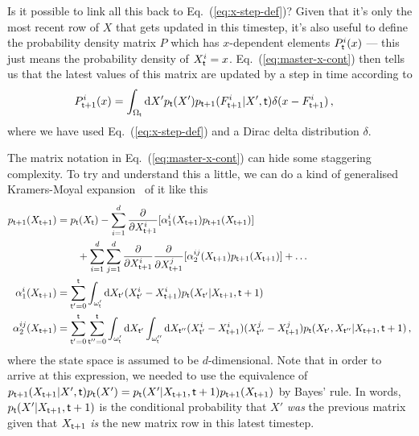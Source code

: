 \documentclass{book}
\begin{document}
Is it possible to link all this back to Eq.~(\ref{eq:x-step-def})? Given that it's only the most recent row of $X$ that gets updated in this timestep, it's also useful to define the probability density matrix $P$ which has $x$-dependent elements $P^i_{\sf t}(x)$ --- this just means the probability density of $X^i_{\sf t}=x$. Eq.~(\ref{eq:master-x-cont}) then tells us that the latest values of this matrix are updated by a step in time according to
\begin{align}
P^i_{{\sf t}+1}(x) &= \int_{\Omega_{\sf t}}{\rm d}X' p_{\sf t}(X') p_{{\sf t}+1}(F^i_{{\sf t}+1}|X',{\sf t}) \delta (x-F^i_{{\sf t}+1}) \label{eq:master-x-cont-update}\,,
\end{align}
where we have used Eq.~(\ref{eq:x-step-def}) and a Dirac delta distribution $\delta$.

The matrix notation in Eq.~(\ref{eq:master-x-cont}) can hide some staggering complexity. To try and understand this a little, we can do a kind of generalised Kramers-Moyal expansion~\cite{kramers1940brownian,moyal1949stochastic} of it like this
\begin{align}
p_{{\sf t}+1}(X_{{\sf t}+1}) &= p_{{\sf t}}(X_{{\sf t}}) - \sum_{i=1}^d\frac{\partial}{\partial X^i_{{\sf t}+1}}[\alpha^i_1 (X_{{\sf t}+1})p_{{\sf t}+1}(X_{{\sf t}+1})] \nonumber \\
& \qquad + \sum_{i=1}^d\sum_{j=1}^d\frac{\partial}{\partial X^i_{{\sf t}+1}}\frac{\partial}{\partial X^j_{{\sf t}+1}}[\alpha^{ij}_2 (X_{{\sf t}+1})p_{{\sf t}+1}(X_{{\sf t}+1})] + \dots \label{eq:master-x-cont-kramers-moyal} \\
\alpha^i_1(X_{{\sf t}+1}) &= \sum_{{\sf t}'=0}^{\sf t}\int_{\omega_{\sf t}'} {\rm d}X_{{\sf t}'}(X^i_{{\sf t}'}-X^i_{{\sf t}+1})p_{\sf t}(X_{{\sf t}'}\vert X_{{\sf t}+1},{\sf t}+1) \\
\alpha^{ij}_2(X_{{\sf t}+1}) &= \sum_{{\sf t}'=0}^{\sf t}\sum_{{\sf t}''=0}^{\sf t}\int_{\omega_{\sf t}'} {\rm d}X_{{\sf t}'}\int_{\omega_{\sf t}''} {\rm d}X_{{\sf t}''}(X^i_{{\sf t}'}-X^i_{{\sf t}+1})(X^j_{{\sf t}''}-X^j_{{\sf t}+1})p_{\sf t}(X_{{\sf t}'}, X_{{\sf t}''}\vert X_{{\sf t}+1},{\sf t}+1) \,,
\end{align}
where the state space is assumed to be $d$-dimensional. Note that in order to arrive at this expression, we needed to use the equivalence of $p_{{\sf t}+1}(X_{{\sf t}+1}\vert X',{\sf t})p_{\sf t}(X') = p_{\sf t}(X'\vert X_{{\sf t}+1},{\sf t}+1)p_{{\sf t}+1}(X_{{\sf t}+1})$ by Bayes' rule. In words, $p_{\sf t}(X'\vert X_{{\sf t}+1},{\sf t}+1)$ is the conditional probability that $X'$ \emph{was} the previous matrix given that $X_{{\sf t}+1}$ \emph{is} the new matrix row in this latest timestep.
\end{document}
